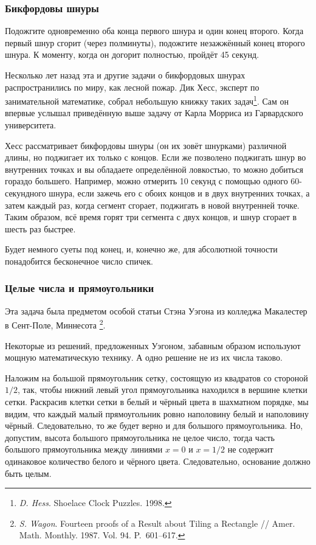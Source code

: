 \documentclass[twoside]{book}
\begin{document}
\subsubsection*{Бикфордовы шнуры} %

Подожгите одновременно оба конца первого шнура и один конец второго.
Когда первый шнур сгорит (через полминуты), подожгите незажжённый конец второго шнура.
К моменту, когда он догорит полностью, пройдёт 45 секунд.
\heart

\medskip

Несколько лет назад эта и другие задачи о бикфордовых шнурах распространились по миру, как лесной пожар.
Дик Хесс, эксперт по занимательной математике, 
собрал небольшую книжку таких задач\footnote{\emph{D. Hess}. %
{Shoelace Clock Puzzles}. 1998.}.
Сам он впервые услышал приведённую выше задачу от Карла Морриса из Гарвардского университета.

Хесс рассматривает бикфордовы шнуры (он их зовёт шнурками) различной длины, но поджигает их только с концов.
Если же позволено поджигать шнур во внутренних точках и вы обладаете определённой ловкостью, то можно добиться гораздо большего.
Например, можно отмерить 10 секунд с помощью одного 60-секундного шнура, если зажечь его с обоих концов и в двух внутренних точках, а затем каждый раз, когда сегмент сгорает, поджигать в новой внутренней точке.
Таким образом, всё время горят три сегмента с двух концов, и шнур сгорает в шесть раз быстрее.

Будет немного суеты под конец, и, конечно же, для абсолютной точности
понадобится бесконечное число спичек.

\subsubsection*{Целые числа и прямоугольники} %

Эта задача была предметом особой
статьи Стэна Уэгона из колледжа Макалестер в Сент-Поле, Миннесота%
\footnote{\emph{S. Wagon}. Fourteen proofs of a Result about Tiling a Rectangle /\!/ {Amer. Math. Monthly}. 1987. Vol. 94. P.~601--617.}.

Некоторые из решений, предложенных Уэгоном, забавным образом используют мощную математическую технику.
А одно решение не из их числа таково.

\medskip

Наложим на большой прямоугольник сетку, состоящую из квадратов со стороной $1/2$, так, чтобы нижний левый угол прямоугольника находился в вершине клетки сетки.
Раскрасив клетки сетки в белый и чёрный цвета в шахматном порядке, 
мы видим, что каждый малый прямоугольник ровно наполовину белый и наполовину чёрный.
Следовательно, то же будет верно и для большого прямоугольника.
Но, допустим, высота большого прямоугольника не целое число, тогда часть 
большого прямоугольника между линиями $x=0$ и $x=1/2$ не содержит одинаковое количество белого и чёрного цвета.
Следовательно, основание должно быть целым.\heart
\end{document}
